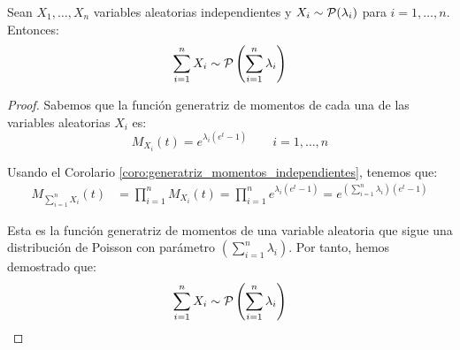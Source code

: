 \begin{prop}
    Sean $X_1, \dots, X_n$ variables aleatorias independientes y $X_i\sim \mathcal{P}(\lambda_i)$ para $i=1,\dots,n$. Entonces:
    \begin{equation*}
        \sum_{i=1}^{n}X_i \sim \mathcal{P}\left(\sum_{i=1}^{n}\lambda_i\right)
    \end{equation*}

    \begin{proof}
        Sabemos que la función generatriz de momentos de cada una de las variables aleatorias $X_i$ es:
        \begin{equation*}
            M_{X_i}(t) = e^{\lambda_i(e^t-1)} \qquad i=1,\dots,n
        \end{equation*}

        Usando el Corolario \ref{coro:generatriz_momentos_independientes}, tenemos que:
        \begin{align*}
            M_{\sum\limits_{i=1}^{n}X_i}(t) &= \prod_{i=1}^{n}M_{X_i}(t) = \prod_{i=1}^{n}e^{\lambda_i(e^t-1)} = e^{\left(\sum\limits_{i=1}^{n}\lambda_i\right)(e^t-1)}
        \end{align*}

        Esta es la función generatriz de momentos de una variable aleatoria que sigue una distribución de Poisson con parámetro $\left(\sum\limits_{i=1}^{n}\lambda_i\right)$. Por tanto, hemos demostrado que:
        \begin{equation*}
            \sum_{i=1}^{n}X_i \sim \mathcal{P}\left(\sum_{i=1}^{n}\lambda_i\right)
        \end{equation*}
    \end{proof}
\end{prop}

